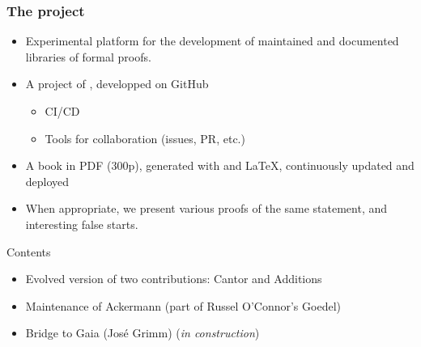 \documentclass[10pt, fleqn]{beamer}
\begin{document}
\begin{frame}
  \frametitle{The \Hydras project}
  \begin{block}{}
    \begin{itemize}
   \item Experimental platform for the  development of \textcolor{lookcolor}{maintained} and \textcolor{lookcolor}{documented} libraries of formal proofs.
    \item A project of \community, developped on GitHub
      \begin{itemize}
      \item CI/CD
        \item Tools for collaboration (issues, PR, etc.)
        \end{itemize}
      \item A book in PDF (300p), generated  with \textcolor{lookcolor}{\alectr} and \LaTeX, continuously updated and deployed
  \item          When appropriate, we present various proofs of the same statement, and interesting false starts.
    \end{itemize}
  \end{block}
  \begin{block}{Contents}
    \begin{itemize}
    \item Evolved version  of two contributions: \textcolor{plugincolor}{Cantor} and \textcolor{plugincolor}{Additions}
    \item Maintenance of \textcolor{plugincolor}{Ackermann}
      (part of Russel O'Connor's \textcolor{plugincolor}{Goedel})
    \item Bridge to \textcolor{plugincolor}{Gaia} (José Grimm) (\emph{in construction})
   
    \end{itemize}
  \end{block}
 
\end{frame}
   

  
\end{document}
